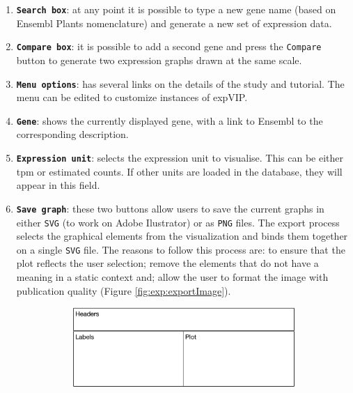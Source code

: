 \begin{enumerate}
\item
  \textbf{\lstinline!Search box!}: at any point it is possible to type a new gene name (based on Ensembl Plants nomenclature) and generate a new set of expression data.
\item
  \textbf{\lstinline!Compare box!}: it is possible to add a second gene and press the \lstinline!Compare! button to generate two expression graphs drawn at the same scale.
\item
  \textbf{\lstinline!Menu options!}: has several links on the details of the study and tutorial. The menu can be edited to customize instances of expVIP. 
\item
  \textbf{\lstinline!Gene!}: shows the currently displayed gene, with a link to Ensembl to the corresponding description. 
\item
  \textbf{\lstinline!Expression unit!}: selects the expression unit to visualise. This can be either \gls{tpm} or  estimated counts. If other units are loaded in the database, they will appear in this field. 
\item
  \textbf{\lstinline!Save graph!}: these two buttons allow users to save the current graphs in either \lstinline!SVG! (to work on Adobe Ilustrator) or as \lstinline!PNG! files. 
  The export process selects the graphical elements from the visualization and binds them together on a single \verb|SVG| file. The reasons to follow this process are: to ensure that the plot reflects the user selection; remove the elements that do not have a meaning in a static context and; allow the user to format the image with publication quality (Figure \ref{fig:exp:exportImage}).

\begin{figure}

\begin{subfigure}{1\textwidth}
\caption{}
\label{fig:exp:exportLayout}
\includegraphics[width=1\textwidth]{expVIP/Figures/Exportsketch.pdf}
\end{subfigure}


\end{figure}
\end{enumerate}
